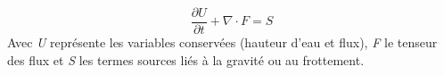 \[
\frac{\partial U}{\partial t}+\nabla \cdot F=S
\]
Avec \textit{U} représente les variables conservées (hauteur d'eau et flux), \textit{F} le tenseur des flux et \textit{S} les termes sources liés à la gravité ou au frottement.